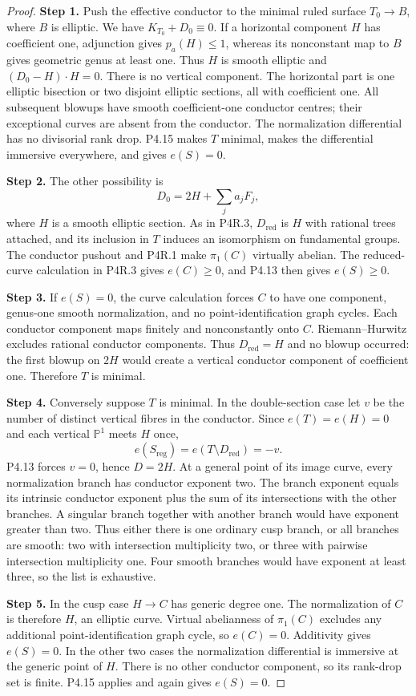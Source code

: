 \begin{proof}
\noindent\textbf{Step 1.} Push the effective conductor to the minimal ruled
surface $T_0\to B$, where $B$ is elliptic. We have
$K_{T_0}+D_0\equiv0$. If a horizontal component $H$
has coefficient one, adjunction gives $p_a(H)\le1$,
whereas its nonconstant map to $B$ gives geometric
genus at least one. Thus $H$ is smooth elliptic and
$(D_0-H)\cdot H=0$. There is no vertical component.
The horizontal part is one elliptic bisection or two
disjoint elliptic sections, all with coefficient one.
All subsequent blowups have smooth coefficient-one
conductor centres; their exceptional curves are absent
from the conductor. The normalization differential
has no divisorial rank drop. P4.15 makes $T$ minimal,
makes the differential immersive everywhere, and
gives $e(S)=0$.

\noindent\textbf{Step 2.} The other possibility is
\[
 D_0=2H+\sum_j a_jF_j,
\]
where $H$ is a smooth elliptic section. As in P4R.3,
$D_{\mathrm{red}}$ is $H$ with rational trees attached,
and its inclusion in $T$ induces an isomorphism on
fundamental groups. The conductor pushout and P4R.1
make $\pi_1(C)$ virtually abelian. The reduced-curve
calculation in P4R.3 gives $e(C)\ge0$, and P4.13 then
gives $e(S)\ge0$.

\noindent\textbf{Step 3.} If $e(S)=0$, the curve calculation forces $C$ to have
one component, genus-one smooth normalization, and
no point-identification graph cycles. Each conductor
component maps finitely and nonconstantly onto $C$.
Riemann--Hurwitz excludes rational conductor
components. Thus $D_{\mathrm{red}}=H$ and no blowup
occurred: the first blowup on $2H$ would create a
vertical conductor component of coefficient one.
Therefore $T$ is minimal.

\noindent\textbf{Step 4.} Conversely suppose $T$ is minimal. In the double-section
case let $v$ be the number of distinct vertical fibres
in the conductor. Since $e(T)=e(H)=0$ and each vertical
$\mathbb P^1$ meets $H$ once,
\[
 e(S_{\mathrm{reg}})=e(T\setminus D_{\mathrm{red}})=-v.
\]
P4.13 forces $v=0$, hence $D=2H$. At a general point
of its image curve, every normalization branch has
conductor exponent two. The branch exponent equals
its intrinsic conductor exponent plus the sum of its
intersections with the other branches. A singular
branch together with another branch would have
exponent greater than two. Thus either there is one
ordinary cusp branch, or all branches are smooth:
two with intersection multiplicity two, or three
with pairwise intersection multiplicity one. Four
smooth branches would have exponent at least three,
so the list is exhaustive.

\noindent\textbf{Step 5.} In the cusp case $H\to C$ has generic degree one.
The normalization of $C$ is therefore $H$, an elliptic
curve. Virtual abelianness of $\pi_1(C)$ excludes any
additional point-identification graph cycle, so
$e(C)=0$. Additivity gives $e(S)=0$. In the other two
cases the normalization differential is immersive at
the generic point of $H$. There is no other conductor
component, so its rank-drop set is finite. P4.15
applies and again gives $e(S)=0$.
\end{proof}


